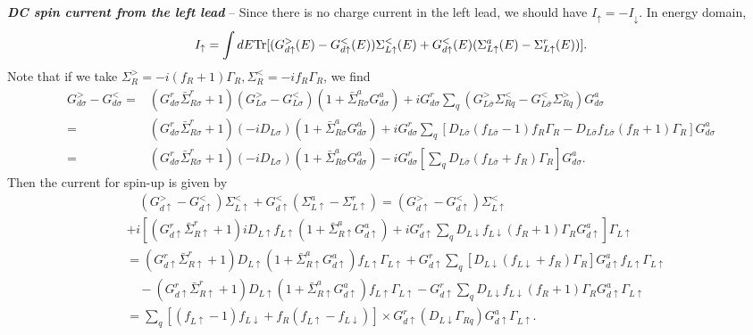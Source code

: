 \documentclass[aps,prb,superscriptaddress]{revtex4-2}
\begin{document}
{\noindent \bf{\textit{DC spin current from the left lead}}} -- Since there is no charge current in the left lead, we should have $I_\uparrow= -I_\downarrow$. In energy domain,
\begin{eqnarray}
I_\uparrow = \int dE {\rm Tr} [(G_{d\uparrow}^>(E)-G_{d\uparrow}^<(E))\Sigma^<_{L\uparrow}(E) +G_{d\uparrow}^<(E) (\Sigma_{L\uparrow}^a(E) -\Sigma_{L\uparrow}^r(E))]. \label{up1}
\end{eqnarray}
Note that if we take  $\Sigma_R^{>}=-i(f_R+1)\Gamma_R, \Sigma_R^{<}=-if_R\Gamma_R$, we find
\begin{equation}
\begin{split}
G^>_{d\sigma} - G^<_{d\sigma} =&(G^r_{d\sigma}{\bar \Sigma}_{R\sigma}^r+1) (G^>_{L\sigma}-G^<_{L\sigma}) (1+{\bar \Sigma}_{R\sigma}^a
G^a_{d\sigma}) +i G^r_{d\sigma} \sum_q (G^>_{L\bar\sigma}\Sigma_{Rq}^< - G^<_{L\bar\sigma}\Sigma_{Rq}^>) G^a_{d\sigma} \\
=& (G^r_{d\sigma}{\bar \Sigma}_{R\sigma}^r+1) (-iD_{L\sigma}) (1+{\bar \Sigma}_{R\sigma}^a
G^a_{d\sigma}) +i G^r_{d\sigma} \sum_q [D_{L\bar\sigma}(f_{L\bar\sigma}-1)f_{R}\Gamma_R - D_{L\bar\sigma}f_{L\bar\sigma}(f_R+1)\Gamma_{R}] G^a_{d\sigma} \\
=& (G^r_{d\sigma}{\bar \Sigma}_{R\sigma}^r+1) (-iD_{L\sigma}) (1+{\bar \Sigma}_{R\sigma}^a
G^a_{d\sigma})  - i G^r_{d\sigma}[ \sum_q D_{L\bar\sigma}(f_{L\bar\sigma}+f_{R})\Gamma_R ] G^a_{d\sigma}.
\end{split}
\end{equation}
Then the current for spin-up is given by
\begin{equation}
\begin{split}
&\quad(G_{d\uparrow}^>-G_{d\uparrow}^< )\Sigma_{L\uparrow}^< +G_{d\uparrow}^< (\Sigma_{L\uparrow}^a-\Sigma_{L\uparrow}^r) = (G_{d\uparrow}^>-G_{d\uparrow}^< )\Sigma_{L\uparrow}^< \\
&+ i[(G^r_{d\uparrow}{\bar \Sigma}_{R\uparrow}^r+1) iD_{L\uparrow}f_{L\uparrow} (1+{\bar \Sigma}_{R\uparrow}^a
G^a_{d\uparrow}) +i G^r_{d\uparrow} \sum_q D_{L\downarrow}f_{L\downarrow}(f_R+1)\Gamma_R G^a_{d\uparrow}]\Gamma_{L\uparrow} \\
&= (G^r_{d\uparrow}{\bar \Sigma}_{R\uparrow}^r+1) D_{L\uparrow} (1+{\bar \Sigma}_{R\uparrow}^a G^a_{d\uparrow})f_{L\uparrow}\Gamma_{L\uparrow} + G^r_{d\uparrow} \sum_q [D_{L\downarrow}(f_{L\downarrow}+f_{R})\Gamma_{R}] G^a_{d\uparrow} f_{L\uparrow}\Gamma_{L\uparrow} \\
&\quad - (G^r_{d\uparrow}{\bar \Sigma}_{R\uparrow}^r+1) D_{L\uparrow} (1+{\bar \Sigma}_{R\uparrow}^a G^a_{d\uparrow}) f_{L\uparrow}\Gamma_{L\uparrow} - G^r_{d\uparrow} \sum_q D_{L\downarrow}f_{L\downarrow}(f_R+1)\Gamma_R G^a_{d\uparrow} \Gamma_{L\uparrow} \\
& =\sum_q [(f_{L\uparrow}-1)f_{L\downarrow} + f_R(f_{L\uparrow}-f_{L\downarrow})] \times G^r_{d\uparrow} (D_{L\downarrow} \Gamma_{Rq}) G^a_{d\uparrow}\Gamma_{L\uparrow}.
\end{split}
\end{equation}
\end{document}
